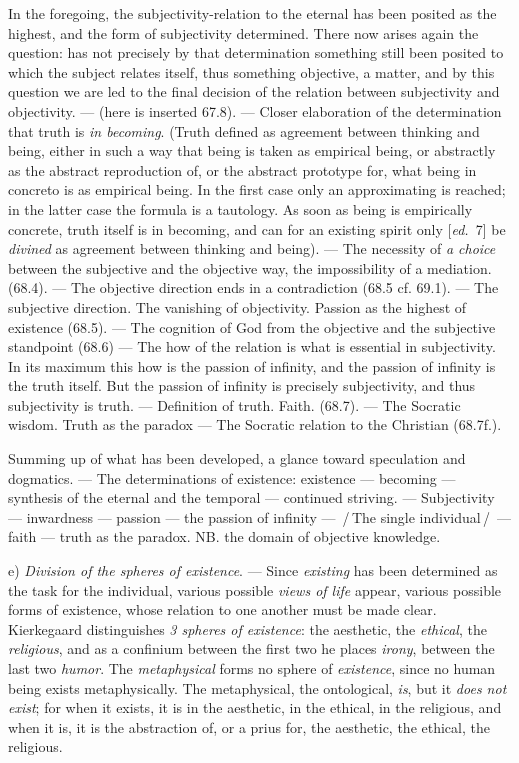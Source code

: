 \documentclass[12pt,a4paper,openany]{book}
\newcommand{\kpage}[1]{\marginnote{\footnotesize\textit{[#1]}}}
\newcommand{\ed}[1]{{\small[\textit{ed.}\ #1]}}
\newcommand{\ins}[1]{\,/\,#1\,/\,}
\newcommand{\lecture}[1]{\par\bigskip\noindent{\large #1}\par\nobreak\medskip}
\begin{document}
In the foregoing, the subjectivity-relation to the eternal has been posited as
the highest, and the form of subjectivity determined. There now arises again
the question: has not precisely by that determination something still been posited
to which the subject relates itself, thus something objective, a matter,
and by this question we are led to the final decision of the relation
between subjectivity and objectivity. --- (here is inserted
67.8). --- Closer elaboration of the determination that truth is \emph{in
becoming}. (Truth defined as agreement between thinking
and being, either in such a way that being is taken as empirical being,
or abstractly as the abstract reproduction of, or the abstract
prototype for, what being in concreto is as empirical being. In the
first case only an approximating is reached; in the latter case
the formula is a tautology. As soon as being is empirically concrete,
truth itself is in becoming, and can for an existing spirit only \ed{7}
be \emph{divined} as agreement between thinking and being). ---
The necessity of \emph{a choice} between the subjective and the objective
way, the impossibility of a mediation. (68.4). --- The objective direction
ends in a contradiction (68.5 cf. 69.1). --- The subjective direction.
The vanishing of objectivity. Passion as the highest of existence
(68.5). --- The cognition of God from the objective and the subjective
standpoint (68.6) --- The how of the relation is what is essential
in subjectivity. In its maximum this how is the passion of infinity,
and the passion of infinity is the truth itself. But
the passion of infinity is precisely subjectivity, and thus
subjectivity is truth. --- Definition of truth. Faith.
(68.7). --- The Socratic wisdom. Truth as the paradox --- The
Socratic relation to the Christian (68.7f.).

Summing up of what has been developed, a glance toward speculation and
dogmatics. --- The determinations of existence: existence --- becoming ---
synthesis of the eternal and the temporal --- continued striving. --- Subjectivity
--- inwardness --- passion --- the passion of infinity ---
\ins{The single individual} --- faith --- truth as the paradox. NB. the domain of objective
knowledge.

\lecture{\kpage{129}\ed{69.6 continued} Lecture 24}

e) \emph{Division of the spheres of existence}. --- Since \emph{existing} has been determined as
the task for the individual, various possible \emph{views of life} appear,
various possible forms of existence, whose relation to one another must
be made clear. Kierkegaard distinguishes \emph{3 spheres of existence}: the aesthetic,
the \emph{ethical}, the \emph{religious}, and as a confinium between the first two he places
\emph{irony}, between the last two \emph{humor}. The \emph{metaphysical} forms no
sphere of \emph{existence}, since no human being exists metaphysically. The metaphysical,
the ontological, \emph{is}, but it \emph{does not exist}; for when it exists,
it is in the aesthetic, in the ethical, in the religious, and when it is,
it is the abstraction of, or a prius for, the aesthetic, the ethical,
the religious.
\end{document}
